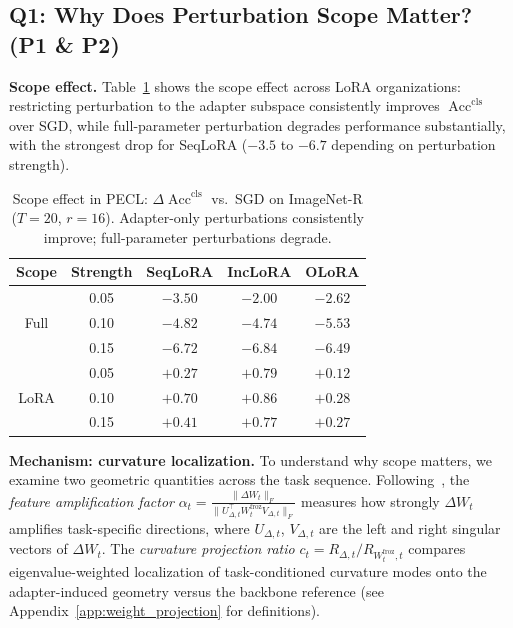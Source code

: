 \subsection{Q1: Why Does Perturbation Scope Matter? (P1 \& P2)}
\label{sec:q1-scope}

\noindent\textbf{Scope effect.}
Table~\ref{tab:lora_or_full_cls_show} shows the scope effect across LoRA organizations: restricting perturbation to the adapter subspace consistently improves $\operatorname{Acc}^{\mathrm{cls}}$ over SGD, while full-parameter perturbation degrades performance substantially, with the strongest drop for SeqLoRA ($-3.5$ to $-6.7$ depending on perturbation strength).

{%
\setlength{\textfloatsep}{4pt}
\setlength{\abovecaptionskip}{2pt}
\setlength{\belowcaptionskip}{4pt}
\begin{table}[t]
\vspace{-5pt}
\centering
\caption{Scope effect in PECL: $\Delta\operatorname{Acc}^{\mathrm{cls}}$ vs.\ SGD on ImageNet-R ($T=20$, $r=16$). Adapter-only perturbations consistently improve; full-parameter perturbations degrade.}
\label{tab:lora_or_full_cls_show}
\footnotesize
\setlength{\tabcolsep}{3pt}
\renewcommand{\arraystretch}{0.88}
\begin{tabular}{@{}c c c c c@{}}
\toprule
\textbf{Scope} & \textbf{Strength} & \textbf{SeqLoRA} & \textbf{IncLoRA} & \textbf{OLoRA} \\
\midrule
\multirow{3}{*}{Full}
 & 0.05 & $-3.50$ & $-2.00$ & $-2.62$ \\
 & 0.10 & $-4.82$ & $-4.74$ & $-5.53$ \\
 & 0.15 & $-6.72$ & $-6.84$ & $-6.49$ \\
\midrule
\multirow{3}{*}{LoRA}
 & 0.05 & $+0.27$ & $+0.79$ & $+0.12$ \\
 & 0.10 & $+0.70$ & $+0.86$ & $+0.28$ \\
 & 0.15 & $+0.41$ & $+0.77$ & $+0.27$ \\
\bottomrule
\end{tabular}
\vspace{-5pt}
\end{table}
}

\noindent\textbf{Mechanism: curvature localization.}
To understand why scope matters, we examine two geometric quantities across the task sequence.
Following~\citet{hu_lora_2021}, the \emph{feature amplification factor}
$\alpha_t = \frac{\|\Delta W_t\|_F}{\|U_{\Delta,t}^\top W_t^{\mathrm{froz}} V_{\Delta,t}\|_F}$
measures how strongly $\Delta W_t$ amplifies task-specific directions, where $U_{\Delta,t}$, $V_{\Delta,t}$ are the left and right singular vectors of $\Delta W_t$.
The \emph{curvature projection ratio} $c_t = R_{\Delta,t} / R_{W_t^{\mathrm{froz}},t}$ compares eigenvalue-weighted localization of task-conditioned curvature modes onto the adapter-induced geometry versus the backbone reference (see Appendix~\ref{app:weight_projection} for definitions).

